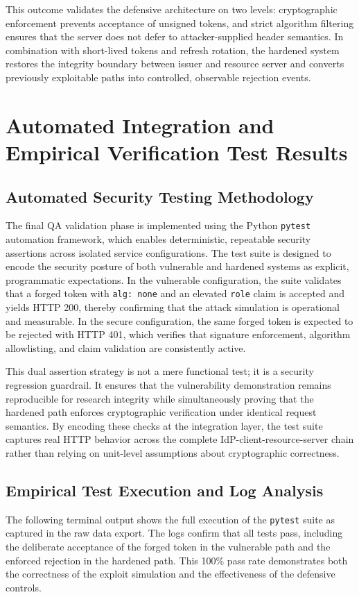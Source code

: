 \documentclass[11pt,a4paper]{report}
\begin{document}
This outcome validates the defensive architecture on two levels: cryptographic enforcement prevents acceptance of unsigned tokens, and strict algorithm filtering ensures that the server does not defer to attacker-supplied header semantics. In combination with short-lived tokens and refresh rotation, the hardened system restores the integrity boundary between issuer and resource server and converts previously exploitable paths into controlled, observable rejection events.

\chapter{Automated Integration and Empirical Verification Test Results}
\label{chap:qa}

\section{Automated Security Testing Methodology}
\label{sec:qa-method}
The final QA validation phase is implemented using the Python \texttt{pytest} automation framework, which enables deterministic, repeatable security assertions across isolated service configurations. The test suite is designed to encode the security posture of both vulnerable and hardened systems as explicit, programmatic expectations. In the vulnerable configuration, the suite validates that a forged token with \texttt{alg: none} and an elevated \texttt{role} claim is accepted and yields HTTP 200, thereby confirming that the attack simulation is operational and measurable. In the secure configuration, the same forged token is expected to be rejected with HTTP 401, which verifies that signature enforcement, algorithm allowlisting, and claim validation are consistently active.

This dual assertion strategy is not a mere functional test; it is a security regression guardrail. It ensures that the vulnerability demonstration remains reproducible for research integrity while simultaneously proving that the hardened path enforces cryptographic verification under identical request semantics. By encoding these checks at the integration layer, the test suite captures real HTTP behavior across the complete IdP-client-resource-server chain rather than relying on unit-level assumptions about cryptographic correctness.

\section{Empirical Test Execution and Log Analysis}
\label{sec:qa-logs}
The following terminal output shows the full execution of the \texttt{pytest} suite as captured in the raw data export. The logs confirm that all tests pass, including the deliberate acceptance of the forged token in the vulnerable path and the enforced rejection in the hardened path. This 100\% pass rate demonstrates both the correctness of the exploit simulation and the effectiveness of the defensive controls.
\end{document}
